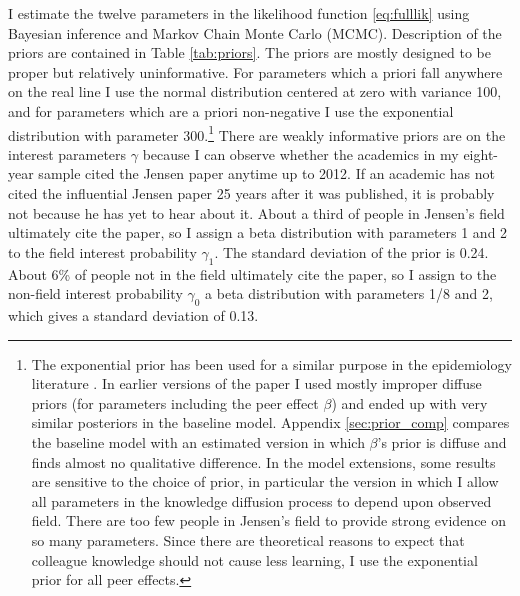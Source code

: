\documentclass[]{article}
\begin{document}
I estimate the twelve parameters in the likelihood function \eqref{eq:fulllik}
using Bayesian inference and Markov Chain Monte Carlo (MCMC).  Description of the priors
are contained in Table \ref{tab:priors}.  The priors are mostly designed to be proper but 
relatively uninformative.  For parameters which a priori fall anywhere on the real line
I use the normal distribution centered at zero with variance 100, and for parameters which
are a priori non-negative I use the exponential distribution with parameter 300.\footnote{The exponential prior has 
been used for a similar purpose in the epidemiology literature  \citep{cauchemez2004bayesian}.  In earlier 
versions of the paper I used mostly improper diffuse priors (for parameters including the peer effect $\beta$) and ended up with very similar posteriors in the baseline model.  Appendix \ref{sec:prior_comp} compares the baseline model with an estimated version in which $\beta$'s prior is diffuse and finds almost no qualitative difference.  In the model extensions, some results are sensitive to the choice of prior, in particular the version in which I allow all parameters in the knowledge diffusion process to depend upon observed field.  There are too few people in Jensen's field to provide strong evidence on so many parameters.  Since there are theoretical reasons to expect that colleague knowledge should not cause less learning, I use the exponential prior for all peer effects.}
There are weakly informative priors are on the interest parameters $\gamma$ because I can
observe whether the academics in my eight-year sample cited the Jensen paper anytime up to
2012. If an academic has not cited the influential Jensen paper 25 years after it was
published, it is probably not because he has yet to hear about it.
About a third of people in Jensen's field ultimately cite the paper, so I assign a beta
distribution with parameters 1 and 2 to the field interest probability
$\gamma_1$. The standard deviation of the prior is 0.24. About 6\% of
people not in the field ultimately cite the paper, so I assign to the
non-field interest probability $\gamma_0$ a beta distribution with
parameters 1/8 and 2, which gives a standard deviation of 0.13.
\end{document}
